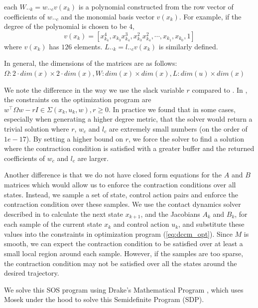 \documentclass[journal]{IEEEtran}
\begin{document}
each $W.._{k} = w.._c v(x_k)$ is a polynomial constructed from the row vector of coefficients of $w.._c$ and the monomial basis vector $v(x_k)$. For example, if the degree of the polynomial is chosen to be $4$,
\begin{equation}
	v(x_k) = [x^4_{k_4}, x_{k_3}x^3_{k_4}, x^2_{k_3}x^2_{k_4}, \cdots ,x_{k_1}, x_{k_0}, 1]
\end{equation}
where $v(x_k)$ has $126$ elements. $L.._k = l.._c v(x_k)$ is similarly defined.

In general, the dimensions of the matrices are as follows: $\Omega: 2 \cdot dim(x) \times 2 \cdot dim(x), W: dim(x) \times dim(x), L: dim(u) \times dim(x)$

We note the difference in the way we use the slack variable $r$ compared to \autocite{weiControlContractionMetric2021}. In \autocite{weiControlContractionMetric2021}, the constraints on the optimization program are $w^\top \Omega w - r I \in \Sigma(x_k, u_k, w), r \geq 0$. In practice we found that in some cases, especially when generating a higher degree metric, that the solver would return a trivial solution where $r$, $w_c$ and $l_c$ are extremely small numbers (on the order of $1e-17$). By setting a higher bound on $r$, we force the solver to find a solution where the contraction condition is satisfied with a greater buffer and the returned coefficients of $w_c$ and $l_c$ are larger.

Another difference is that we do not have closed form equations for the $A$ and $B$ matrices which would allow us to enforce the contraction conditions over all states. Instead, we sample a set of state, control action pairs and enforce the contraction condition over these samples. We use the contact dynamics solver described in \autocite{pangGlobalPlanningContactRich2023} to calculate the next state $x_{k+1}$, and the Jacobians $A_k$ and $B_k$, for each sample of the current state $x_k$ and control action $u_k$, and substitute these values into the constraints in optimization program (\ref{eq:dccm_opt}). Since $M$ is smooth, we can expect the contraction condition to be satisfied over at least a small local region around each sample. However, if the samples are too sparse, the contraction condition may not be satisfied over all the states around the desired trajectory.

We solve this SOS program using Drake's Mathematical Program \autocite{DrakeModelBasedDesign}, which uses Mosek under the hood to solve this Semidefinite Program (SDP).
\end{document}

